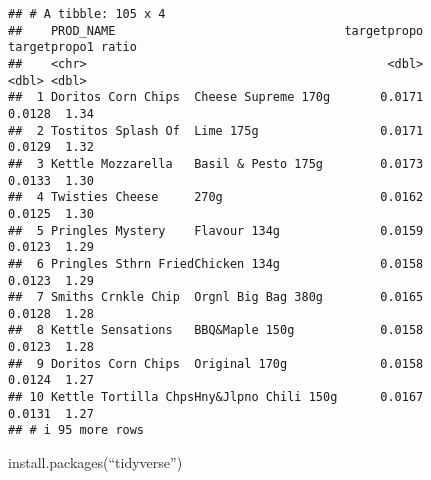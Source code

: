 \documentclass[
]{article}
\begin{document}
\begin{verbatim}
## # A tibble: 105 x 4
##    PROD_NAME                                targetpropo targetpropo1 ratio
##    <chr>                                          <dbl>        <dbl> <dbl>
##  1 Doritos Corn Chips  Cheese Supreme 170g       0.0171       0.0128  1.34
##  2 Tostitos Splash Of  Lime 175g                 0.0171       0.0129  1.32
##  3 Kettle Mozzarella   Basil & Pesto 175g        0.0173       0.0133  1.30
##  4 Twisties Cheese     270g                      0.0162       0.0125  1.30
##  5 Pringles Mystery    Flavour 134g              0.0159       0.0123  1.29
##  6 Pringles Sthrn FriedChicken 134g              0.0158       0.0123  1.29
##  7 Smiths Crnkle Chip  Orgnl Big Bag 380g        0.0165       0.0128  1.28
##  8 Kettle Sensations   BBQ&Maple 150g            0.0158       0.0123  1.28
##  9 Doritos Corn Chips  Original 170g             0.0158       0.0124  1.27
## 10 Kettle Tortilla ChpsHny&Jlpno Chili 150g      0.0167       0.0131  1.27
## # i 95 more rows
\end{verbatim}

install.packages(``tidyverse'')
\end{document}
